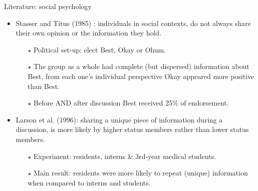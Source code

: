 \documentclass[xcolor=table]{beamer}
\begin{document}
\begin{frame}{Literature: social psychology}
\begin{itemize}
	\item Stasser and Titus (1985) : individuals in social contexts, do not always share their own opinion or the information they hold.
		\begin{itemize} \setlength\itemsep{1em}
			\item[{\color{gray}$\star$}] {\color{gray}Political set-up: elect Best, Okay or Ohum. }
			\item[{\color{gray}$\star$}] {\color{gray}The group as a whole had complete (but dispersed) information about Best, from each one’s individual perspective Okay appeared more positive than Best. }%
			\item[{\color{gray}$\star$}] {\color{gray}Before AND after discussion Best received 25\% of endorsement.} 
		\end{itemize}
		\item Larson et al. (1996): sharing a unique piece of information during a discussion, is more likely by higher status members rather than lower status members.
			\begin{itemize} \setlength\itemsep{1em}
				\item[{\color{gray}$\star$}] {\color{gray}Experiment: residents, interns \& 3rd-year medical students.}
				\item[{\color{gray}$\star$}] {\color{gray}Main result: residents were more likely to repeat (unique) information when compared to interns and students.}
			\end{itemize} 	
\end{itemize}
\end{frame}
%
\end{document}

